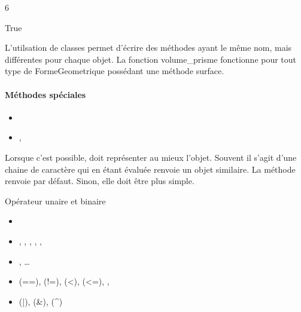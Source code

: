 \documentclass[letterpaper,10pt,english]{sphinxhowto}
\begin{document}
\begin{sphinxVerbatim}[commandchars=\\\{\}]
6
\end{sphinxVerbatim}

\begin{sphinxVerbatim}[commandchars=\\\{\}]
True
\end{sphinxVerbatim}

\sphinxAtStartPar
L’utilsation de classes permet d’écrire des méthodes ayant le même nom, mais différentes pour chaque objet. La fonction volume\_prisme fonctionne pour tout type de FormeGeometrique possédant une méthode surface.


\paragraph{Méthodes spéciales}
\label{\detokenize{cours6_objet_cours:methodes-speciales}}\begin{itemize}
\item {} 
\sphinxAtStartPar
{}

\item {} 
\sphinxAtStartPar
{}, 

\end{itemize}

\sphinxAtStartPar
Lorsque c’est possible,  doit représenter au mieux l’objet. Souvent il s’agit d’une chaine de caractère qui en étant évaluée renvoie un objet similaire. La méthode  renvoie  par défaut. Sinon, elle doit être plus simple.

\sphinxAtStartPar
Opérateur unaire et binaire
\begin{itemize}
\item {} 
\sphinxAtStartPar
{}

\item {} 
\sphinxAtStartPar
{}, , , , , 

\item {} 
\sphinxAtStartPar
{}, …

\item {} 
\sphinxAtStartPar
{} (==),  (!=),  (<),  (<=), , 

\item {} 
\sphinxAtStartPar
{} (|),  (\&), (\textasciicircum{})

\end{itemize}
\end{document}
